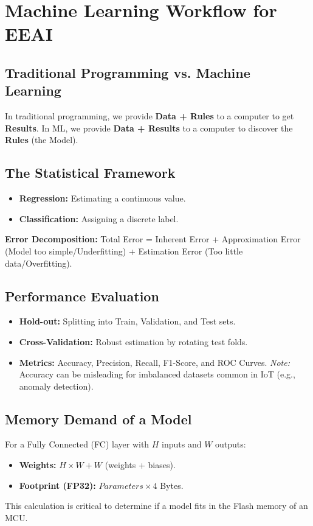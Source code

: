 \section{Machine Learning Workflow for EEAI}

\subsection{Traditional Programming vs. Machine Learning}
In traditional programming, we provide \textbf{Data + Rules} to a computer to get \textbf{Results}. In ML, we provide \textbf{Data + Results} to a computer to discover the \textbf{Rules} (the Model).

\subsection{The Statistical Framework}
\begin{itemize}
    \item \textbf{Regression:} Estimating a continuous value.
    \item \textbf{Classification:} Assigning a discrete label.
\end{itemize}
\textbf{Error Decomposition:} Total Error = Inherent Error + Approximation Error (Model too simple/Underfitting) + Estimation Error (Too little data/Overfitting).

\subsection{Performance Evaluation}
\begin{itemize}
    \item \textbf{Hold-out:} Splitting into Train, Validation, and Test sets.
    \item \textbf{Cross-Validation:} Robust estimation by rotating test folds.
    \item \textbf{Metrics:} Accuracy, Precision, Recall, F1-Score, and ROC Curves. \textit{Note:} Accuracy can be misleading for imbalanced datasets common in IoT (e.g., anomaly detection).
\end{itemize}

\subsection{Memory Demand of a Model}
For a Fully Connected (FC) layer with $H$ inputs and $W$ outputs:
\begin{itemize}
    \item \textbf{Weights:} $H \times W + W$ (weights + biases).
    \item \textbf{Footprint (FP32):} $Parameters \times 4$ Bytes.
\end{itemize}
This calculation is critical to determine if a model fits in the Flash memory of an MCU.
